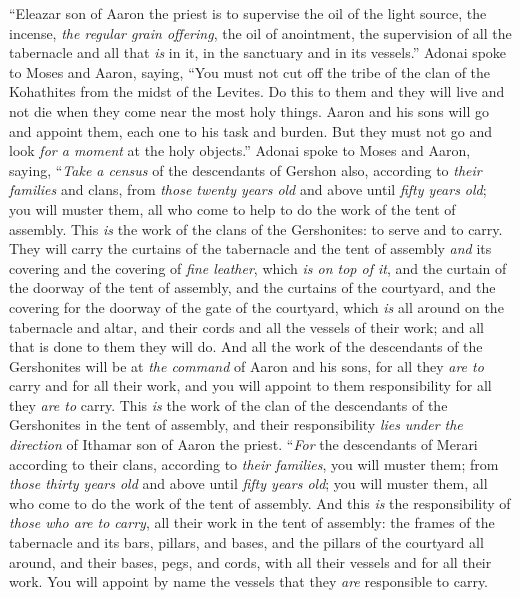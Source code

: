 \begin{biblechapter}
\verse “Eleazar son of Aaron the priest is to supervise the oil of the light source, the incense, \textit{the regular grain offering}, the oil of anointment, the supervision of all the tabernacle and all that \textit{is} in it, in the sanctuary and in its vessels.”
\verse Adonai spoke to Moses and Aaron, saying,
\verse “You must not cut off the tribe of the clan of the Kohathites from the midst of the Levites.
\verse Do this to them and they will live and not die when they come near the most holy things. Aaron and his sons will go and appoint them, each one to his task and burden.
\verse But they must not go and look \textit{for a moment} at the holy objects.”
\verse Adonai spoke to Moses and Aaron, saying,
\verse “\textit{Take a census} of the descendants of Gershon also, according to \textit{their families} and clans,
\verse from \textit{those twenty years old} and above until \textit{fifty years old}; you will muster them, all who come to help to do the work of the tent of assembly.
\verse This \textit{is} the work of the clans of the Gershonites: to serve and to carry.
\verse They will carry the curtains of the tabernacle and the tent of assembly \textit{and} its covering and the covering of \textit{fine leather}, which \textit{is on top of it}, and the curtain of the doorway of the tent of assembly,
\verse and the curtains of the courtyard, and the covering for the doorway of the gate of the courtyard, which \textit{is} all around on the tabernacle and altar, and their cords and all the vessels of their work; and all that is done to them they will do.
\verse And all the work of the descendants of the Gershonites will be at \textit{the command} of Aaron and his sons, for all they \textit{are to} carry and for all their work, and you will appoint to them responsibility for all they \textit{are to} carry.
\verse This \textit{is} the work of the clan of the descendants of the Gershonites in the tent of assembly, and their responsibility \textit{lies} \textit{under the direction} of Ithamar son of Aaron the priest.
\verse “\textit{For} the descendants of Merari according to their clans, according to \textit{their families}, you will muster them;
\verse from \textit{those thirty years old} and above until \textit{fifty years old}; you will muster them, all who come to do the work of the tent of assembly.
\verse And this \textit{is} the responsibility of \textit{those who are to carry}, all their work in the tent of assembly: the frames of the tabernacle and its bars, pillars, and bases,
\verse and the pillars of the courtyard all around, and their bases, pegs, and cords, with all their vessels and for all their work. You will appoint by name the vessels that they \textit{are} responsible to carry.

\end{biblechapter}
